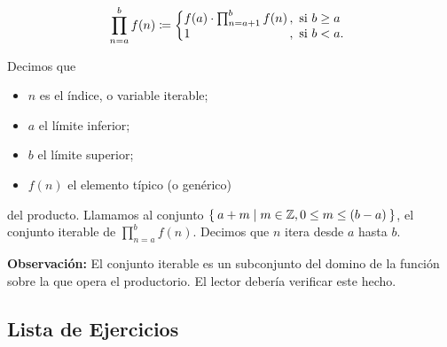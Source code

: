 \[
    \prod_{n=a}^{b} f(n) \defined \left\{
    \begin{array}{@{}l@{\thinspace}l}
    f(a) \cdot \prod_{n=a+1}^{b} f(n) &,  \ \text{si}  \ b\geq a\\
    1 &,  \ \text{si}  \ b<a.
    \end{array} \right. \]

Decimos que
\begin{itemize}
  \item $n$ es el índice, o variable iterable;
  \item $a$ el límite inferior;
  \item $b$ el límite superior;
  \item $f(n)$ el elemento típico (o genérico)
\end{itemize}
del producto. Llamamos al conjunto $\Set{a + m | m\in \mathbb{Z}, 0\leq m \leq (b-a)}$, el conjunto iterable de $\prod_{n=a}^{b} f(n)$. Decimos que $n$ itera desde $a$ hasta $b$.

\textbf{Observación:} El conjunto iterable es un subconjunto del domino de la función sobre la que opera el productorio. El lector debería verificar este hecho.

\subsection*{Lista de Ejercicios}

